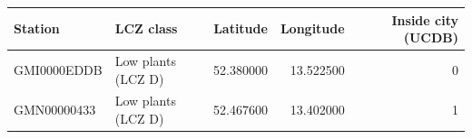 \begin{tabular}{llrrr}
\toprule
Station & LCZ class & Latitude & Longitude & Inside city (UCDB) \\
\midrule
GMI0000EDDB & Low plants (LCZ D) & 52.380000 & 13.522500 & 0 \\
GMN00000433 & Low plants (LCZ D) & 52.467600 & 13.402000 & 1 \\
\bottomrule
\end{tabular}
